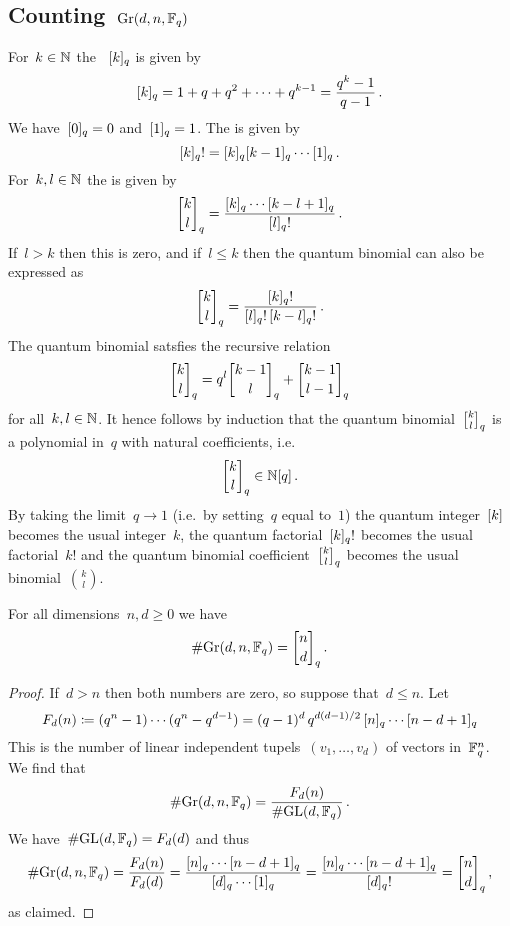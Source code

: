 \documentclass[a4paper,11pt]{scrartcl}
\begin{document}
\subsection{Counting~$\operatorname{Gr}(d, n, \mathbb{F}_q)$}

\begin{recall}
  For~$k \in \mathbb{N}$ the ~$[k]_q$ is given by
  \[
    [k]_q
    =
    1 + q + q^2 + \dotsb + q^{k-1}
    =
    \frac{q^k - 1}{q - 1} \,.
  \]
  We have~$[0]_q = 0$ and~$[1]_q = 1$.
  The  is given by
  \[
    [k]_q !
    =
    [k]_q [k-1]_q \dotsm [1]_q \,.
  \]
  For~$k, l \in \mathbb{N}$ the  is given by
  \[
    \qbinom{k}{l}_q
    =
    \frac{\qnum{k}_q \dotsm \qnum{k-l+1}_q}{\qnum{l}_q!} \,.
  \]
  If~$l > k$ then this is zero, and if~$l \leq k$ then the quantum binomial can also be expressed as
  \[
    \qbinom{k}{l}_q
    =
    \frac{\qnum{k}_q!}{\qnum{l}_q! \, \qnum{k-l}_q!} \,.
  \]
  The quantum binomial satsfies the recursive relation
  \[
    \qbinom{k}{l}_q
    =
    q^l \qbinom{k-1}{l}_q
    +
    \qbinom{k-1}{l-1}_q
  \]
  for all~$k, l \in \mathbb{N}$.
  It hence follows by induction that the quantum binomial~$\qbinom{k}{l}_q$ is a polynomial in~$q$ with natural coefficients, i.e.
  \[
    \qbinom{k}{l}_q
    \in
    \Natural[q] \,.
  \]
  By taking the limit~$q \to 1$ (i.e.\ by setting~$q$ equal to~$1$) the quantum integer~$[k]$ becomes the usual integer~$k$, the quantum factorial~$[k]_q!$ becomes the usual factorial~$k!$ and the quantum binomial coefficient~$\qbinom{k}{l}_q$ becomes the usual binomial~$\binom{k}{l}$.
\end{recall}

\begin{lemma}
  \label{size of quantum grassmannian}
  For all dimensions~$n, d \geq 0$ we have
  \[
    \counting {\Gr(d, n, \Finite_q)}
    =
    \qbinom{n}{d}_q \,.
  \]
\end{lemma}

\begin{proof}
  If~$d > n$ then both numbers are zero, so suppose that~$d \leq n$.  
  Let
  \[
    F_d(n)
    \coloneqq
    (q^n - 1) \dotsm (q^n - q^{d-1})
    =
    (q-1)^d \, q^{d(d-1)/2} \, [n]_q \dotsm [n-d+1]_q
  \]
  This is the number of linear independent tupels~$(v_1, \dotsc, v_d)$ of vectors in~$\mathbb{F}_q^n$.
  We find that
  \[
    \# {\operatorname{Gr}(d, n, \mathbb{F}_q)}
    =
    \frac{ F_d(n) }{ \# {\operatorname{GL}(d, \mathbb{F}_q)} } \,.
  \]
  We have~$\# {\operatorname{GL}(d, \mathbb{F}_q)} = F_d(d)$ and thus
  \[
    \counting {\Gr(d, n, \Finite_q)}
    =
    \frac{ F_d(n) }{ F_d(d) }
    =
    \frac{ \qnum{n}_q \dotsm \qnum{n-d+1}_q }{ \qnum{d}_q \dotsm  \qnum{1}_q }
    =
    \frac{ \qnum{n}_q \dotsm \qnum{n-d+1}_q }{ \qnum{d}_q! }
    =
    \qbinom{n}{d}_q \,,
  \]
  as claimed.
\end{proof}
\end{document}
